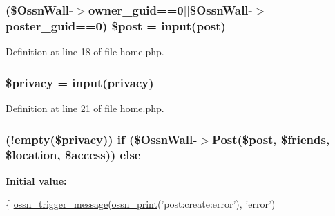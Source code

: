 \subsubsection[{\texorpdfstring{\$post}{$post}}]{ (\${\bf Ossn\+Wall}-\/$>${\bf owner\+\_\+guid}==0$\vert$$\vert$\${\bf Ossn\+Wall}-\/$>${\bf poster\+\_\+guid}==0) \$post = {\bf input}(\textquotesingle{}post\textquotesingle{})}\hypertarget{components_2_ossn_wall_2actions_2wall_2post_2home_8php_ab0afe281b4fde7dbdeff7f1ced2b0b1f}{}\label{components_2_ossn_wall_2actions_2wall_2post_2home_8php_ab0afe281b4fde7dbdeff7f1ced2b0b1f}


Definition at line 18 of file home.\+php.

\subsubsection[{\texorpdfstring{\$privacy}{$privacy}}]{\setlength{\rightskip}{0pt plus 5cm}\$privacy = {\bf input}(\textquotesingle{}privacy\textquotesingle{})}\hypertarget{components_2_ossn_wall_2actions_2wall_2post_2home_8php_add279b6d3dad18665dc1d892af5e6b26}{}\label{components_2_ossn_wall_2actions_2wall_2post_2home_8php_add279b6d3dad18665dc1d892af5e6b26}


Definition at line 21 of file home.\+php.

\subsubsection[{\texorpdfstring{else}{else}}]{ (!empty(\$privacy)) {\bf if} (\${\bf Ossn\+Wall}-\/$>$Post(\$post, \$friends, \${\bf location}, \$access)) else}\hypertarget{components_2_ossn_wall_2actions_2wall_2post_2home_8php_ad1e8628c69b0a7f16ccdf61f6c054adc}{}\label{components_2_ossn_wall_2actions_2wall_2post_2home_8php_ad1e8628c69b0a7f16ccdf61f6c054adc}
{\bfseries Initial value\+:}
\begin{DoxyCode}
\{
        \hyperlink{ossn_8lib_8system_8php_ab3f23f23f32f50c12e7aea0ffaccaac7}{ossn\_trigger\_message}(\hyperlink{ossn_8lib_8languages_8php_a2be5d1c4b695593a9b9067b96df2150a}{ossn\_print}(\textcolor{stringliteral}{'post:create:error'}), \textcolor{stringliteral}{'error'})
\end{DoxyCode}


